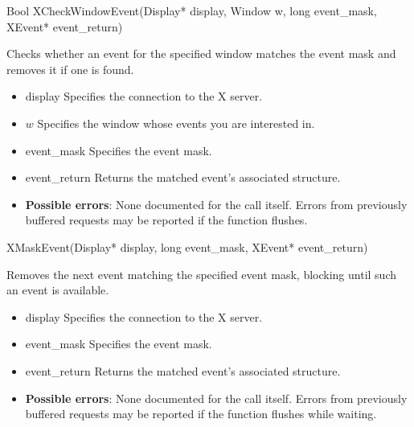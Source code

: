 \documentclass{report}
\begin{document}
\begin{itemize}
        \begin{cppcode}
            Bool XCheckWindowEvent(Display* display, Window w, long event_mask, XEvent* event_return)
        \end{cppcode}
        \bigbreak \noindent
        Checks whether an event for the specified window matches the event mask and removes it if one is found.

        \begin{itemize}
            \item display Specifies the connection to the X server.
            \item $w$ Specifies the window whose events you are interested in.
            \item event\_mask Specifies the event mask.
            \item event\_return Returns the matched event’s associated structure.
        \end{itemize}

        \begin{itemize}
            \item \textbf{Possible errors}: None documented for the call itself. Errors from previously buffered requests may be reported if the function flushes.
        \end{itemize}

        \begin{cppcode}
            XMaskEvent(Display* display, long event_mask, XEvent* event_return)
        \end{cppcode}
        \bigbreak \noindent
        Removes the next event matching the specified event mask, blocking until such an event is available.

        \begin{itemize}
            \item display Specifies the connection to the X server.
            \item event\_mask Specifies the event mask.
            \item event\_return Returns the matched event’s associated structure.
        \end{itemize}

        \begin{itemize}
            \item \textbf{Possible errors}: None documented for the call itself. Errors from previously buffered requests may be reported if the function flushes while waiting.
        \end{itemize}


\end{itemize}
\end{document}
